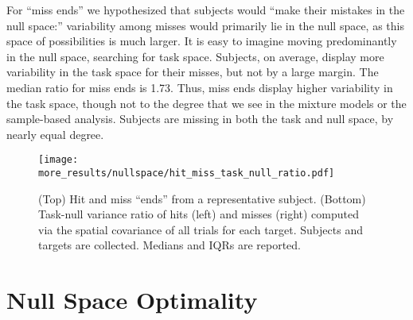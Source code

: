 \documentclass[../main.tex]{subfiles}
\begin{document}
  For ``miss ends'' we hypothesized that subjects would ``make their mistakes in the null space:'' variability among misses would primarily lie in the null space, as this space of possibilities is much larger. It is easy to imagine moving predominantly in the null space, searching for task space. Subjects, on average, display more variability in the task space for their misses, but not by a large margin. The median ratio for miss ends is 1.73. Thus, miss ends display higher variability in the task space, though not to the degree that we see in the mixture models or the sample-based analysis. Subjects are missing in both the task and null space, by nearly equal degree.
  
  \begin{figure}[H]%
    \centering
    \texttt{[image: more\_results/nullspace/hit\_miss\_task\_null\_ratio.pdf]}
    \caption[Task-null variance ratio of hits and misses]{(Top) Hit and miss ``ends'' from a representative subject. (Bottom) Task-null variance ratio of hits (left) and misses (right) computed via the spatial covariance of all trials for each target. Subjects and targets are collected. Medians and IQRs are reported.}\label{fig:hit_miss_nullspace}
  \end{figure}
  



  
  
  
  \section{Null Space Optimality}
      
\end{document}
